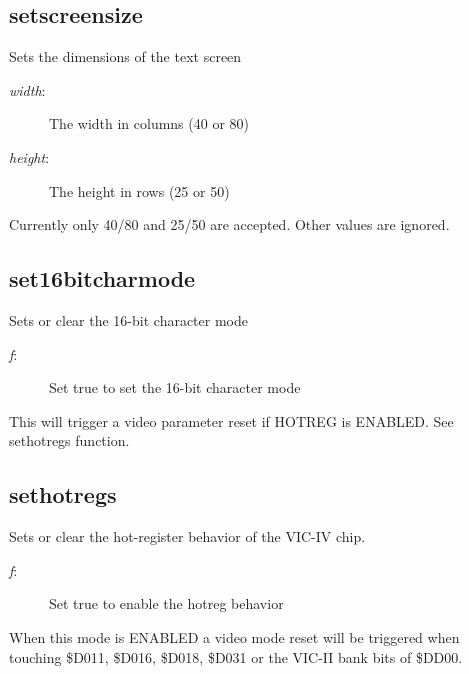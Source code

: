 \subsection{setscreensize}
\begin{description}[leftmargin=2cm,style=nextline]
\item [Description:] {Sets the dimensions of the text screen}
\item [Syntax:] 
\item [Parameters:]
\begin{description}\item[]
\item [{\em width}:] {The width in columns (40 or 80)}
\item [{\em height}:] {The height in rows (25 or 50)}
\end{description}
\item [Notes:] {Currently only 40/80 and 25/50 are accepted. Other values are ignored.}
\end{description}

\subsection{set16bitcharmode}
\begin{description}[leftmargin=2cm,style=nextline]
\item [Description:] {Sets or clear the 16-bit character mode}
\item [Syntax:] 
\item [Parameters:]
\begin{description}\item[]
\item [{\em f}:] {Set true to set the 16-bit character mode}
\end{description}
\item [Notes:] {This will trigger a video parameter reset if HOTREG is ENABLED. See sethotregs function.}
\end{description}

\subsection{sethotregs}
\begin{description}[leftmargin=2cm,style=nextline]
\item [Description:] {Sets or clear the hot-register behavior of the VIC-IV chip.}
\item [Syntax:] 
\item [Parameters:]
\begin{description}\item[]
\item [{\em f}:] {Set true to enable the hotreg behavior}
\end{description}
\item [Notes:] {When this mode is ENABLED a video mode reset will be triggered when touching \$D011, \$D016, \$D018, \$D031 or the VIC-II bank bits of \$DD00. }
\end{description}

